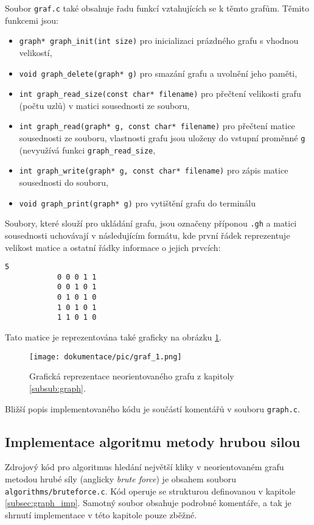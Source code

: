 \documentclass[a4paper]{article}
\begin{document}
        \noindent
        Soubor \lstinline{graf.c} také obsahuje řadu funkcí vztahujících se k těmto grafům. Těmito funkcemi jsou:
        \begin{itemize}
            \item \lstinline{graph* graph_init(int size)} pro inicializaci prázdného grafu s vhodnou velikostí,
            \item \lstinline{void graph_delete(graph* g)} pro smazání grafu a uvolnění jeho paměti,
            \item \lstinline{int graph_read_size(const char* filename)} pro přečtení velikosti grafu (počtu uzlů) v matici sousednosti ze souboru,
            \item \lstinline{int graph_read(graph* g, const char* filename)} pro přečtení matice sousednosti ze souboru, vlastnosti grafu jsou uloženy do vstupní proměnné \lstinline{g} (nevyužívá funkci \lstinline{graph_read_size},
            \item \lstinline{int graph_write(graph* g, const char* filename)} pro zápis matice sousednosti do souboru,
            \item \lstinline{void graph_print(graph* g)} pro vytištění grafu do terminálu
        \end{itemize}

        \noindent
        Soubory, které slouží pro ukládání grafu, jsou označeny příponou \lstinline{.gh} a matici sousednosti uchovávají v následujícím formátu, kde první řádek reprezentuje velikost matice a ostatní řádky informace o jejich prvcích:
        \begin{lstlisting}[caption={Zápis matice v \lstinline{.gh} souboru.},captionpos=b,label={code:zapis_matice}]
            5
            0 0 0 1 1
            0 0 1 0 1
            0 1 0 1 0
            1 0 1 0 1
            1 1 0 1 0
        \end{lstlisting}
        Tato matice je reprezentována také graficky na obrázku \ref{fig:graf1}.
        \begin{figure}[bh]
            \centering
            \texttt{[image: dokumentace/pic/graf\_1.png]}
            \caption{Grafická reprezentace neorientovaného grafu z kapitoly \ref{subsub:graph}.}
            \label{fig:graf1}
        \end{figure}

        \noindent
        Bližší popis implementovaného kódu je součástí komentářů v souboru \lstinline{graph.c}.

    \subsection{Implementace algoritmu metody hrubou silou}
        Zdrojový kód pro algoritmus hledání největší kliky v neorientovaném grafu metodou hrubé síly (anglicky \textit{brute force}) je obsahem souboru \lstinline{algorithms/bruteforce.c}. Kód operuje se strukturou definovanou v kapitole \ref{subsec:graph_imp}. Samotný soubor obsahuje podrobné komentáře, a tak je shrnutí implementace v této kapitole pouze zběžné.\\
\end{document}
